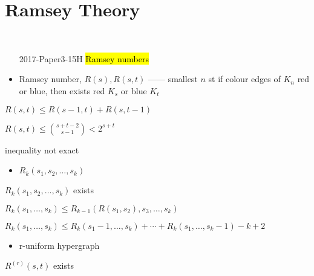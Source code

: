 \section{Ramsey Theory}\label{sec:ramsey-theory}

\begin{exam}
    \,
    \begin{enumerate}
        \item[2017-Paper3-15H] \hl{Ramsey numbers}
    \end{enumerate}
\end{exam}

\begin{itemize}
    \item Ramsey number, $R(s), R(s, t)$ ------ smallest $n$ st if colour edges of $K_n$ red or blue, then exists red $K_s$ or blue $K_t$
\end{itemize}

\begin{thm}[Ramsey]
    $R(s, t) \leq R(s - 1, t) + R(s, t - 1)$
\end{thm}

\begin{fact}
    $R(s, t) \leq {s + t - 2 \choose s-1} < 2^{s + t}$
\end{fact}
\begin{fact}
    inequality not exact
\end{fact}

\begin{itemize}
    \item $R_k(s_1, s_2, \dots, s_k)$
\end{itemize}

\begin{thm}
    $R_k(s_1, s_2, \dots, s_k)$ exists
\end{thm}

\begin{fact}
    $R_k(s_1, \dots, s_k) \leq R_{k-1}(R(s_1, s_2), s_3, \dots, s_k)$
\end{fact}

\begin{fact}
    $R_k(s_1, \dots, s_k) \leq R_k(s_1 - 1, \dots, s_k) + \cdots + R_k(s_1, \dots, s_k - 1) - k + 2$
\end{fact}

\begin{itemize}
    \item r-uniform hypergraph
\end{itemize}

\begin{thm}
    $R^{(r)}(s, t)$ exists
\end{thm}

